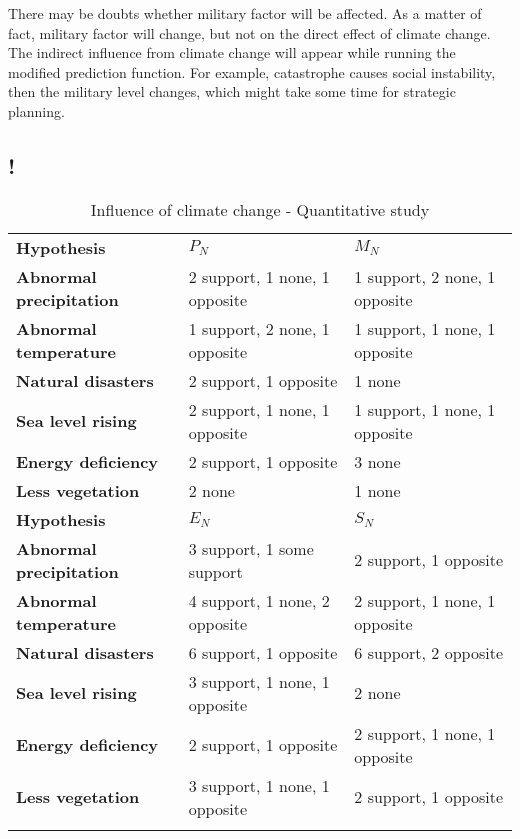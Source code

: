 \documentclass{mcmthesis}
\newlength\savedwidth
\newcommand\whline{\noalign{\global\savedwidth\arrayrulewidth
                            \global\arrayrulewidth 1.2pt}%
                   \hline
                   \noalign{\global\arrayrulewidth\savedwidth}}
\newlength\savewidth
\newcommand\shline{\noalign{\global\savewidth\arrayrulewidth
                            \global\arrayrulewidth 1.2pt}%
                   \hline
                   \noalign{\global\arrayrulewidth\savewidth}}
\begin{document}
There may be doubts whether military factor will be affected. As a matter of fact, military factor will change, but not on the direct effect of climate change. The indirect influence from climate change will appear while running the modified prediction function. For example, catastrophe causes social instability, then the military level changes, which might take some time for strategic planning.


\subsection{!}

\begin{table}[htbp]
	\renewcommand\arraystretch{1.5}
	\footnotesize
	\centering
	\begin{tabular}{m{3.8cm}<{\centering}|m{4.8cm}<{\centering}|m{4.8cm}<{\centering}}
		\whline
		\textbf{Hypothesis}&\textbf{$P_N$}&\textbf{$M_N$}\\
		\whline
		\textbf{Abnormal precipitation}& 2 support, 1 none, 1 opposite &1 support, 2 none, 1 opposite\\
		
		\textbf{Abnormal temperature}&1 support, 2 none, 1 opposite&1 support, 1 none, 1 opposite\\
		
		\textbf{Natural disasters}&2 support, 1 opposite&1 none\\
		
		\textbf{Sea level rising}&2 support, 1 none, 1 opposite&1 support, 1 none, 1 opposite\\
		
		\textbf{Energy deficiency}&2 support, 1 opposite&3 none\\
		
		\textbf{Less vegetation}&2 none&1 none\\
		
		\shline
		\textbf{Hypothesis}&\textbf{$E_N$}&\textbf{$S_N$}\\
		\whline
		\textbf{Abnormal precipitation}& 3 support, 1 some support &2 support, 1 opposite\\
		
		\textbf{Abnormal temperature}&4 support, 1 none, 2 opposite&2 support, 1 none, 1 opposite\\
		
		\textbf{Natural disasters}&6 support, 1 opposite&6 support, 2 opposite\\
		
		\textbf{Sea level rising}&3 support, 1 none, 1 opposite&2 none\\
		
		\textbf{Energy deficiency}&2 support, 1 opposite&2 support, 1 none, 1 opposite\\
		
		\textbf{Less vegetation}&3 support, 1 none, 1 opposite&2 support, 1 opposite\\
		\shline
	\end{tabular}
	\caption{Influence of climate change - Quantitative study}\label{tab:Influence of climate change - Quantitative study}
\end{table}
\end{document}

